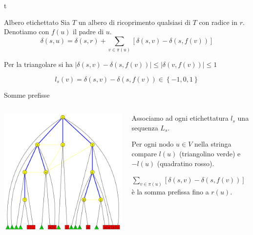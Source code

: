 t \documentclass{beamer}
\theoremstyle{plain}
\theoremstyle{definition}
\theoremstyle{remark}
\newcommand{\set}[1]{\left\{#1\right\}}
\newcommand{\pa}[1]{\left(#1\right)}
\newcommand{\bra}[1]{\left[#1\right]}
\newcommand{\abs}[1]{\left|#1\right|}
\begin{document}
\begin{frame}{Albero etichettato}
  Sia $T$ un albero di ricoprimento qualsiasi di $T$ con radice in
  $r$. Denotiamo con $f(u)$ il padre di $u$.
  \vfill
  \[ \delta\pa{ s,u} = \delta\pa{ s,r} + \sum _{v\in \pi (u)} \bra{
    \delta\pa{ s,v} - \delta\pa{ s,f(v) } } \]
  
  Per la triangolare si ha $\abs{\delta\pa{ s,v} - \delta\pa{ s,f(v)}
  } \le \abs{\delta\pa{v,f(v)}} \le 1$ \vfill
  
  \pause
  \[ l_s(v) = \delta\pa{s,v} - \delta\pa{ s, f(v) } \in \set{
    -1,0,1} \]
\end{frame}

\begin{frame}{Somme prefisse}
  \begin{columns}
    \begin{column}{0.6\textwidth}
      \includegraphics[width=\textwidth]{labeltree}
    \end{column}
    \begin{column}{0.39\textwidth}
      Associamo ad ogni etichettatura $l_s$ una sequenza $L_s$.

      Per ogni nodo $u\in V$ nella stringa compare $l(u)$ (triangolino
      verde) e $-l(u)$ (quadratino rosso).  \vfill \pause
      
      $\sum _{v\in \pi(u)} \bra{ \delta\pa{ s,v} - \delta\pa{ s,f(v) } }$
      \`e la somma prefissa fino a $r(u)$.
    \end{column}
  \end{columns}
\end{frame}
\end{document}
